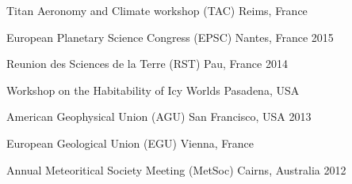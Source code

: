 \begin{cvhonors}
    \cvhonor
    {Titan Aeronomy and Climate workshop (TAC)}
    {}
    {Reims, France}
    {}

  \cvhonor
    {European Planetary Science Congress (EPSC)}
    {}
    {Nantes, France}
    {2015}

  \cvhonor
    {Reunion des Sciences de la Terre (RST)}
    {}
    {Pau, France}
    {2014}

  \cvhonor
    {Workshop on the Habitability of Icy Worlds}
    {}
    {Pasadena, USA}
    {}

  \cvhonor
    {American Geophysical Union (AGU)}
    {}
    {San Francisco, USA}
    {2013}

  \cvhonor
    {European Geological Union (EGU)}
    {}
    {Vienna, France}
    {}

  \cvhonor
    {Annual Meteoritical Society Meeting (MetSoc)}
    {}
    {Cairns, Australia}
    {2012}


\end{cvhonors}
